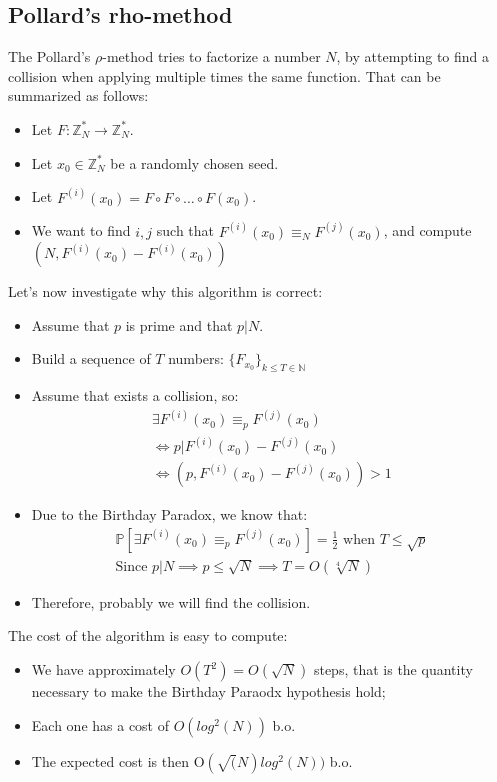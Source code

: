 \subsection{Pollard's rho-method}
The Pollard's $\rho$-method tries to factorize a number $N$, by attempting to find a collision when applying multiple times the same function. That can be summarized as follows:
\begin{itemize}
    \item Let $F: \mathbb{Z}_{N}^{*} \rightarrow \mathbb{Z}_{N}^{*}$.
    \item Let $x_{0} \in \mathbb{Z}_{N}^{*}$ be a randomly chosen seed.
    \item Let $F^{(i)}(x_{0}) = F \circ F \circ \dots \circ F(x_{0})$.
    \item We want to find $i,j$ such that $F^{(i)}(x_{0}) \equiv_{N} F^{(j)}(x_{0})$, and compute $(N, F^{(i)}(x_{0}) - F^{(i)}(x_{0}))$
\end{itemize}
Let's now investigate why this algorithm is correct:
\begin{itemize}
    \item Assume that $p$ is prime and that $p|N$.
    \item Build a sequence of $T$ numbers: $\{F_{x_{0}}\}_{k \leq T \in \mathbb{N}}$
    \item Assume that exists a collision, so:
    \begin{align*}
        \exists F^{(i)}(x_{0}) \equiv_{p} F^{(j)}(x_{0}) \\
        \iff p | F^{(i)}(x_{0}) - F^{(j)}(x_{0}) \\
        \iff (p, F^{(i)}(x_{0}) - F^{(j)}(x_{0})) > 1
    \end{align*}
    \item Due to the Birthday Paradox, we know that:
    \begin{align*}
        \mathbb{P}[\exists F^{(i)}(x_{0}) \equiv_{p} F^{(j)}(x_{0})] = \frac{1}{2} \text{ when } T \leq \sqrt{p} \\
        \text{Since } p|N \implies p \leq \sqrt{N} \implies T = O(\sqrt[4]{N})
    \end{align*}
    \item Therefore, probably we will find the collision.
\end{itemize}
The cost of the algorithm is easy to compute:
\begin{itemize}
    \item We have approximately $O(T^{2}) = O(\sqrt{N})$ steps, that is the quantity necessary to make the Birthday Paraodx hypothesis hold;
    \item Each one has a cost of $O(log^{2}(N))$ b.o.
    \item The expected cost is then O$(\sqrt(N) log^{2}(N))$ b.o.
\end{itemize}

